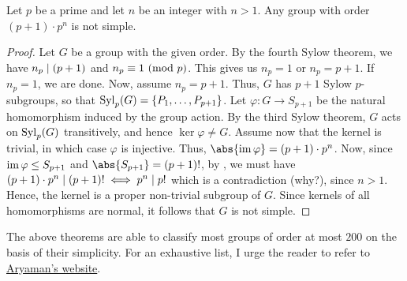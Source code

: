 \begin{theorem}
    Let $p$ be a prime and let $n$ be an integer with $n > 1$. Any group with order $(p+1)\cdot p^n$ is not simple.
\end{theorem}
\begin{proof}
    Let $G$ be a group with the given order. By the fourth Sylow theorem, we have $n_p \mid (p+1)$ and $n_p \equiv 1 \ (\mathrm{mod}\ p)$. This gives us $n_p =1$ or $n_p = p+1$. If $n_p = 1$, we are done. Now, assume $n_p = p+1$. Thus, $G$ has $p+1$ Sylow $p$-subgroups, so that $\operatorname{Syl}_p(G) = \{P_1, \ldots, P_{p+1}\}$. Let $\varphi \colon G \to S_{p+1}$ be the natural homomorphism induced by the group action. By the third Sylow theorem, $G$ acts on $\operatorname{Syl}_p(G)$ transitively, and hence $\ker\varphi \neq G$. Assume now that the kernel is trivial, in which case $\varphi$ is injective. Thus, $\abs{\im\varphi} = (p+1)\cdot p^n$. Now, since $\operatorname{im}\varphi \leq S_{p+1}$ and $\abs{S_{p+1}} = (p+1)!$, by , we must have $(p+1)\cdot p^n \mid (p+1)! \iff p^n \mid p!$ which is a contradiction (why?), since $n > 1$. Hence, the kernel is a proper non-trivial subgroup of $G$. Since kernels of all homomorphisms are normal, it follows that $G$ is not simple.
\end{proof}

The above theorems are able to classify most groups of order at most $200$ on the basis of their simplicity. For an exhaustive list, I urge the reader to refer to \href{https://aryamanmaithani.github.io/alg/groups/simple/sieve/}{Aryaman's website}.